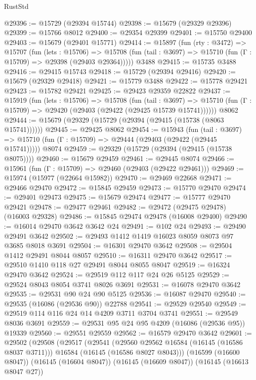\begin{lexlean}{RustStd}
\begin{coremodule}
@29396 := @15729 (@29394 @15744)
@29398 := @15679 (@29329 @29396)
@29399 := @15766 @8012
@29400 := @29354 @29399
@29401 := @15750 @29400
@29403 := @15679 (@29401 @15771)
@29414 := @15897
    (fun (rty : @3472) =>
    @15707
      (fun (lets : @15706) =>
      @15708 (fun (tail : @3697) => @15710 (fun (Γ : @15709) => @29398 (@29403 @29364)))))
    @3488
@29415 := @15735 @3488
@29416 := @29415 @15743
@29418 := @15729 (@29394 @29416)
@29420 := @15679 (@29329 @29418)
@29421 := @15779 @3488
@29422 := @15778 @29421
@29423 := @15782 @29421
@29425 := @29423 @29359 @22822
@29437 := @15919
    (fun (lets : @15706) =>
    @15708
      (fun (tail : @3697) =>
      @15710 (fun (Γ : @15709) => @29420 (@29403 (@29422 (@29425 @15739 @15741))))))
    @8062
@29444 := @15679 (@29329 (@15729 (@29394 (@29415 (@15738 (@8063 @15741))))))
@29445 := @29425 @8062
@29454 := @15943
    (fun (tail : @3697) => @15710 (fun (Γ : @15709) => @29444 (@29403 (@29422 (@29445 @15741)))))
    @8074
@29459 := @29329 (@15729 (@29394 (@29415 (@15738 @8075))))
@29460 := @15679 @29459
@29461 := @29445 @8074
@29466 := @15961 (fun (Γ : @15709) => @29460 (@29403 (@29422 @29461)))
@29469 := @15974 (@15977 (@22664 @15982))
@29470 := @29469 @22668
@29471 := @29466 @29470
@29472 := @15845 @29459
@29473 := @15770 @29470
@29474 := @29401 @29473
@29475 := @15679 @29474
@29477 := @15777 @29470 @29421
@29478 := @29477 @29461
@29482 := @29472 (@29475 @29478) (@16003 @29328)
@29486 := @15845 @29474 @29478 (@16008 @29400)
@29490 := @16014 @29470 @3642 @3642 @24
@29491 := @102 @24
@29493 := @29490 @29491 @3642
@29502 := @29493 @1412 @1419 @16023 @8059 @8073 @97 @3685 @8018 @3691
@29504 := @16301 @29470 @3642
@29508 := @29504 @1412 @29491 @8044 @8057
@29510 := @16311 @29470 @3642
@29517 := @29510 @1410 @118 @27 @29491 @8044 @8055 @8047
@29519 := @16324 @29470 @3642
@29524 := @29519 @112 @117 @24 @26 @5125
@29529 := @29524 @8043 @8054 @3741 @8026 @3691
@29531 := @16078 @29470 @3642
@29535 := @29531 @90 @24 @90 @5125
@29536 := @16087 @29470
@29540 := @29535 (@16086 (@29536 @90)) @22788
@29541 := @29529 @29540
@29549 := @29519 @114 @116 @24 @14 @4209 @3711 @3704 @3741
@29551 := @29549 @8036 @3691
@29559 := @29531 @95 @24 @95 @4209 (@16086 (@29536 @95)) @19339
@29560 := @29551 @29559
@29562 := @16579 @29470 @3642
@29601 := @29502
    (@29508
      (@29517
        (@29541
          (@29560 @29562 @16584 (@16145 (@16586 @8037 @3711)))
          @16584
          (@16145 (@16586 @8027 @8043)))
        (@16599 (@16600 @8047))
        (@16145 (@16604 @8047))
        (@16145 (@16609 @8047))
        (@16145 (@16613 @8047 @27))

\end{coremodule}
\end{lexlean}
